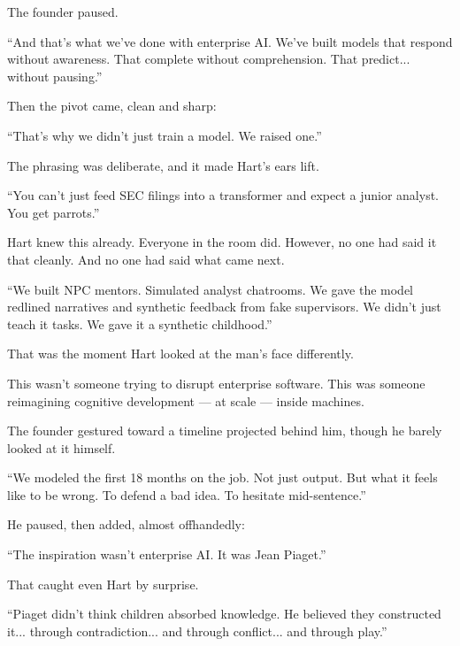 The founder paused.

``And that’s what we’ve done with enterprise AI.
We’ve built models that respond without awareness.
That complete without comprehension.
That predict... without pausing.''

Then the pivot came, clean and sharp:

``That’s why we didn’t just train a model.
We raised one.''







The phrasing was deliberate, and it made Hart’s ears lift.

``You can’t just feed SEC filings into a transformer and expect a junior analyst. You get parrots.''

Hart knew this already. 
Everyone in the room did. 
However, no one had said it that cleanly. 
And no one had said what came next.

``We built NPC mentors. 
Simulated analyst chatrooms. 
We gave the model redlined narratives and synthetic feedback from fake supervisors. 
We didn’t just teach it tasks. 
We gave it a synthetic childhood.''

That was the moment Hart looked at the man’s face differently.

This wasn’t someone trying to disrupt enterprise software. 
This was someone reimagining cognitive development --- at scale --- inside machines.

The founder gestured toward a timeline projected behind him, though he barely looked at it himself.

``We modeled the first 18 months on the job. 
Not just output. 
But what it feels like to be wrong. 
To defend a bad idea. 
To hesitate mid-sentence.''

He paused, then added, almost offhandedly:

``The inspiration wasn’t enterprise AI. It was Jean Piaget.''

That caught even Hart by surprise.

``Piaget didn’t think children absorbed knowledge. 
He believed they constructed it... through contradiction... and through conflict... and through play.''

\medskip

